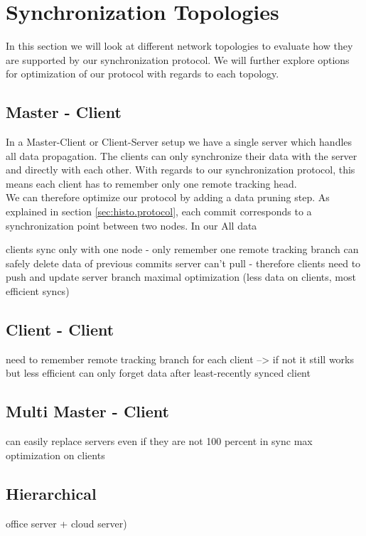
\section{Synchronization Topologies}
\label{sec:histo.topologies}

In this section we will look at different network topologies to evaluate how they are supported by our synchronization protocol.
We will further explore options for optimization of our protocol with regards to each topology.\\

\subsection{Master - Client}
In a Master-Client or Client-Server setup we have a single server which handles all data propagation.
The clients can only synchronize their data with the server and directly with each other.
With regards to our synchronization protocol, this means each client has to remember only one remote tracking head.\\
We can therefore optimize our protocol by adding a data pruning step.
As explained in section \ref{sec:histo.protocol}, each commit corresponds to a synchronization point between two nodes.
In our 
All data 

clients sync only with one node - only remember one remote tracking branch
can safely delete data of previous commits
server can't pull - therefore clients need to push and update server branch
maximal optimization (less data on clients, most efficient syncs)

\subsection{Client - Client}
need to remember remote tracking branch for each client
--> if not it still works but less efficient
can only forget data after least-recently synced client

\subsection{Multi Master - Client}
can easily replace servers even if they are not 100 percent in sync
max optimization on clients

\subsection{Hierarchical}
office server + cloud server)
